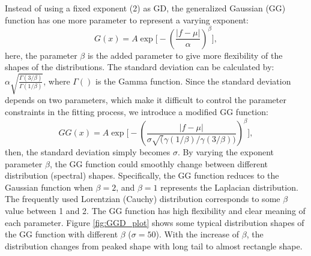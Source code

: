 Instead of using a fixed exponent (2) as GD, the generalized Gaussian (GG) function has one more parameter to represent a varying exponent:%
\begin{equation}
G(x) = A\exp\biggl[-\left(\frac{|f-\mu|}{\alpha}\right)^{\beta}\biggr],
\label{eq:GGD}
\end{equation}
\noindent here, the parameter $\beta$ is the added parameter to give more flexibility of the shapes of the distributions. The standard deviation can be calculated by: $\alpha\sqrt{\frac{\Gamma(3/\beta)}{\Gamma(1/\beta)}}$, where $\Gamma()$ is the Gamma function. Since the standard deviation depends on two parameters, which make it difficult to control the parameter constraints in the fitting process, we introduce a modified GG function:%
\begin{equation}
GG(x) = A\exp\biggl[-\left(\frac{|f-\mu|}{\sigma\sqrt(\gamma(1/\beta)/\gamma(3/\beta))}\right)^{\beta}\biggr],
\label{eq:GGD}
\end{equation}
\noindent then, the standard deviation simply becomes $\sigma$. By varying the exponent parameter $\beta$, the GG function could smoothly change between different distribution (spectral) shapes. Specifically, the GG function reduces to the Gaussian function when $\beta = 2$, and $\beta = 1$ represents the Laplacian distribution. The frequently used Lorentzian (Cauchy) distribution corresponds to some $\beta$ value between 1 and 2. The GG function has high flexibility and clear meaning of each parameter. Figure \ref{fig:GGD_plot} shows some typical distribution shapes of the GG function with different $\beta$ ($\sigma = 50$). With the increase of $\beta$, the distribution changes from peaked shape with long tail to almost rectangle shape.  


